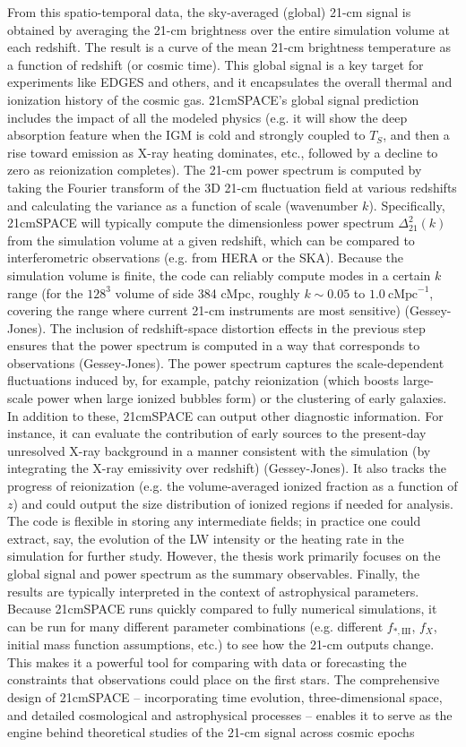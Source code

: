 \documentclass[floats,floatfix,showpacs,amssymb,prd,superscriptaddress,nofootinbib]{revtex4-2} %
\begin{document}
From this spatio-temporal data, the sky-averaged (global) 21-cm signal is obtained by averaging the 21-cm brightness over the entire simulation volume at each redshift. The result is a curve of the mean 21-cm brightness temperature as a function of redshift (or cosmic time). This global signal is a key target for experiments like EDGES and others, and it encapsulates the overall thermal and ionization history of the cosmic gas. 21cmSPACE’s global signal prediction includes the impact of all the modeled physics (e.g. it will show the deep absorption feature when the IGM is cold and strongly coupled to $T_S$, and then a rise toward emission as X-ray heating dominates, etc., followed by a decline to zero as reionization completes). The 21-cm power spectrum is computed by taking the Fourier transform of the 3D 21-cm fluctuation field at various redshifts and calculating the variance as a function of scale (wavenumber $k$). Specifically, 21cmSPACE will typically compute the dimensionless power spectrum $\Delta^2_{21}(k)$ from the simulation volume at a given redshift, which can be compared to interferometric observations (e.g. from HERA or the SKA). Because the simulation volume is finite, the code can reliably compute modes in a certain $k$ range (for the $128^3$ volume of side 384 cMpc, roughly $k \sim 0.05$ to $1.0~\text{cMpc}^{-1}$, covering the range where current 21-cm instruments are most sensitive) (Gessey-Jones). The inclusion of redshift-space distortion effects in the previous step ensures that the power spectrum is computed in a way that corresponds to observations (Gessey-Jones). The power spectrum captures the scale-dependent fluctuations induced by, for example, patchy reionization (which boosts large-scale power when large ionized bubbles form) or the clustering of early galaxies. In addition to these, 21cmSPACE can output other diagnostic information. For instance, it can evaluate the contribution of early sources to the present-day unresolved X-ray background in a manner consistent with the simulation (by integrating the X-ray emissivity over redshift) (Gessey-Jones). It also tracks the progress of reionization (e.g. the volume-averaged ionized fraction as a function of $z$) and could output the size distribution of ionized regions if needed for analysis. The code is flexible in storing any intermediate fields; in practice one could extract, say, the evolution of the LW intensity or the heating rate in the simulation for further study. However, the thesis work primarily focuses on the global signal and power spectrum as the summary observables. Finally, the results are typically interpreted in the context of astrophysical parameters. Because 21cmSPACE runs quickly compared to fully numerical simulations, it can be run for many different parameter combinations (e.g. different $f_{*,\text{III}}$, $f_X$, initial mass function assumptions, etc.) to see how the 21-cm outputs change. This makes it a powerful tool for comparing with data or forecasting the constraints that observations could place on the first stars. The comprehensive design of 21cmSPACE – incorporating time evolution, three-dimensional space, and detailed cosmological and astrophysical processes – enables it to serve as the engine behind theoretical studies of the 21-cm signal across cosmic epochs 
\end{document}
